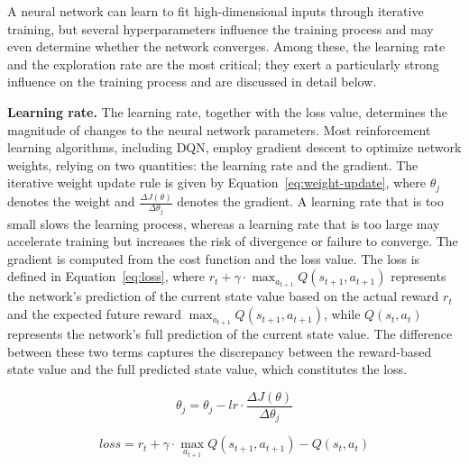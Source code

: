 A neural network can learn to fit high-dimensional inputs through iterative training, but several hyperparameters influence the training process and may even determine whether the network converges. Among these, the learning rate and the exploration rate are the most critical; they exert a particularly strong influence on the training process and are discussed in detail below.

\textbf{Learning rate.} The learning rate, together with the loss value, determines the magnitude of changes to the neural network parameters. Most reinforcement learning algorithms, including DQN, employ gradient descent to optimize network weights, relying on two quantities: the learning rate and the gradient. The iterative weight update rule is given by Equation~\eqref{eq:weight-update}, where $\theta_j$ denotes the weight and $\frac{\Delta J(\theta)}{\Delta \theta_j}$ denotes the gradient. A learning rate that is too small slows the learning process, whereas a learning rate that is too large may accelerate training but increases the risk of divergence or failure to converge. The gradient is computed from the cost function and the loss value. The loss is defined in Equation~\eqref{eq:loss}, where $r_t + \gamma \cdot \max_{a_{t+1}} Q(s_{t+1}, a_{t+1})$ represents the network's prediction of the current state value based on the actual reward $r_t$ and the expected future reward $\max_{a_{t+1}} Q(s_{t+1}, a_{t+1})$, while $Q(s_t, a_t)$ represents the network's full prediction of the current state value. The difference between these two terms captures the discrepancy between the reward-based state value and the full predicted state value, which constitutes the loss.

\begin{equation}
\theta_j = \theta_j - \textit{lr} \cdot \frac{\Delta J(\theta)}{\Delta \theta_j} \label{eq:weight-update}
\end{equation}

\begin{equation}
\textit{loss} = r_t + \gamma \cdot \max_{a_{t+1}} Q(s_{t+1}, a_{t+1}) - Q(s_t, a_t) \label{eq:loss}
\end{equation}

